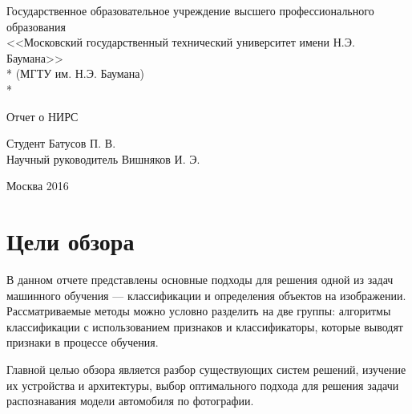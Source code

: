 \documentclass[a4paper,14pt]{extarticle} %
\begin{document}
 
\renewcommand{\figurename}{Рисунок}
\renewcommand{\baselinestretch}{1.5}
\renewcommand{\abstractname}{{Аннотация}}

\begin{titlepage}
\newpage
\begin{center}
Государственное образовательное учреждение высшего профессионального образования \\
\vspace{1cm}
\Large<<Московский государственный технический университет имени Н.Э. Баумана>> \\*
(МГТУ им. Н.Э. Баумана) \\*
\hrulefill
\end{center}
\vspace{8em}
\begin{center}
\Large  Отчет о НИРС
\end{center}
\vspace{8em}
\begin{flushleft}
Студент \hrulefill Батусов П. В. \\
\vspace{1.5em}
Научный руководитель \hrulefill Вишняков И. Э.\\
\vspace{1.5em}
\end{flushleft}
\vspace{\fill}
\begin{center}
Москва 2016
\end{center}
\end{titlepage}

\renewcommand{\contentsname}{\centering Содержание}
\tableofcontents
\newpage

\section{Цели обзора}
\hspace{\parindent} В данном отчете представлены основные подходы для решения одной из задач машинного обучения --- классификации и определения объектов на изображении. Рассматриваемые методы можно условно разделить на две группы: алгоритмы классификации с использованием признаков и классификаторы, которые выводят признаки в процессе обучения. 

Главной целью обзора является разбор существующих систем решений, изучение их устройства и архитектуры, выбор оптимального подхода для решения задачи распознавания модели автомобиля по фотографии.
\end{document}
